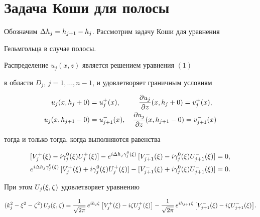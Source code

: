 \section{Задача Коши для полосы}





Обозначим $\Delta h_j=h_{j+1}-h_j$. Рассмотрим задачу Коши для уравнения


Гельмгольца в случае полосы.





\begin{lem}


Распределение $u_j(x,z)$ является решением уравнения $(1)$


в области $D_j$, $j=1,\dotsc,n-1$, и удовлетворяет граничным условиям


\begin{equation}


\begin{split}


u_j(x,h_j+0) &= u^+_j(x), \qquad \ \;


\dfrac{\pa u_j}{\pa z}(x,h_j+0) = v^+_j(x), \\


u_j(x,h_{j+1}-0) &= u^-_{j+1}(x), \quad


\dfrac{\pa u_j}{\pa z}(x,h_{j+1}-0) = v^-_{j+1}(x) 


\end{split}


\end{equation}


тогда и только тогда, когда выполняются равенства


\begin{align}


[V^+_j(\xi)-i\gaoxi{j} U^+_j(\xi)]


- e^{i\De h_j\gaoxi{j}}\, [V^-_{j+1}(\xi)-i\gaoxi{j} U^-_{j+1}(\xi)] &= 0,\\


%


e^{i\De h_j\gaoxi{j}}\,[V^+_j(\xi)+i\gaoxi{j} U^+_j(\xi)]


 - [V^-_{j+1}(\xi)+i\gaoxi{j} U^-_{j+1}(\xi)] &= 0 .


\end{align}


При этом $U_j(\xi,\zeta)$ удовлетворяет уравнению


\begin{equation}


(k_j^2-\xi^2-\dz^2)\,U_j(\xi,\dz) =


\frac{1}{\sqrt{2\pi}}\,e^{ih_j\dz}\,


\bigl[ V^+_j(\xi)-i\dz U^+_j(\xi) \bigr]


- \frac{1}{\sqrt{2\pi}}\,e^{ih_{j+1}\dz}\,


\bigl[ V^-_{j+1}(\xi)-i\dz U^-_{j+1}(\xi) \bigr] .


\end{equation}


\end{lem}





